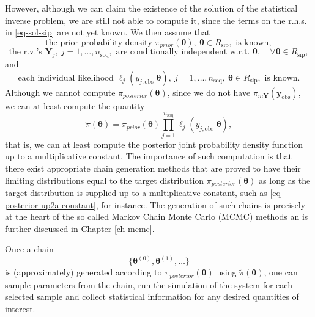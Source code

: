 However, although we can claim the existence of the solution of the statistical inverse problem,
we are still not able to compute it, since the terms on the r.h.s. in \eqref{eq-sol-sip} are not yet known.
We then assume that
\begin{equation}\label{eq-hyp-prior-known}
\text{the prior probability density }\pi_{prior}(\boldsymbol{\theta}),~\boldsymbol\theta\in R_{\text{sip}},\text{ is known},
\end{equation}
\begin{equation}\label{eq-hyp-conditional-independence}
\text{the r.v.'s }\mathbf{Y}_j,~j=1,\ldots,n_{\text{soq}},\text{ are conditionally independent w.r.t. }\boldsymbol\theta,\quad\forall\boldsymbol\theta\in R_{\text{sip}},
\end{equation}
and
\begin{equation}\label{eq-hyp-l-known}
\text{each individual likelihood }\ell_j(y_{j,\text{obs}}|\boldsymbol\theta),~j=1,\ldots,n_{\text{soq}},~\boldsymbol\theta\in R_{\text{sip}},\text{ is known}.
\end{equation}
Although we cannot compute $\pi_{posterior}(\boldsymbol\theta)$,
since we do not have $\pi_{m\mathbf{Y}}(\mathbf{y}_{\text{obs}})$,
we can at least compute the quantity
\begin{equation}\label{eq-posterior-up2a-constant}
\tilde{\pi}(\boldsymbol\theta) =
{\pi_{prior}(\boldsymbol\theta)\prod_{j=1}^{n_{\text{soq}}}\ell_j(y_{j,\text{obs}}|\boldsymbol\theta)},
\end{equation}
that is, we can at least compute the posterior joint probability density function up to a multiplicative constant.
The importance of such computation is that there exist
appropriate chain generation methods that are proved to have their limiting distributions equal 
to the target distribution $\pi_{posterior}(\boldsymbol\theta)$ as long as the target distribution is supplied
up to a multiplicative constant, such as \eqref{eq-posterior-up2a-constant}, for instance.
The generation of such chains is precisely at the heart of the so called Markov Chain Monte Carlo (MCMC) methods
an is further discussed in Chapter \ref{ch-mcmc}.

Once a chain
\begin{equation}\label{eq-markov-chain-1}
\{\boldsymbol{\theta}^{(0)},\boldsymbol{\theta}^{(1)},\ldots\}
\end{equation}
is (approximately) generated according to $\pi_{posterior}(\boldsymbol\theta)$ using $\tilde{\pi}(\boldsymbol\theta)$,
one can
sample parameters from the chain,
run the simulation of the system for each selected sample and
collect statistical information for any desired quantities of interest.


